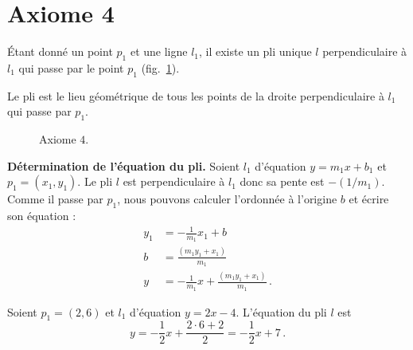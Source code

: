 

\section{Axiome 4}\label{s.ax4}


\begin{axiom}
Étant donné un point $p_1$ et une ligne $l_1$, il existe un pli unique $l$ perpendiculaire à $l_1$ qui passe par le point $p_1$ (fig.~\ref{f.origami-axiom4}).
\end{axiom}

Le pli est le lieu géométrique de tous les points de la droite perpendiculaire à $l_1$ qui passe par $p_1$.

\begin{figure}[htbp]
\centering
{}
\caption{Axiome  $4$.}\label{f.origami-axiom4}
\end{figure}

\noindent\textbf{Détermination de l'équation du pli.}
Soient $l_1$ d'équation $y = m_1x + b_1$ et  $p_1=(x_1,y_1)$. Le pli $l$ est perpendiculaire à $l_1$ donc sa pente est $-(1/m_1)$. Comme il passe par $p_1$, nous pouvons calculer l'ordonnée à l'origine $b$ et écrire son équation :
\begin{align*}
y_1&=-\frac{1}{m_1} x_1 + b\\
b&= \frac{(m_1 y_1+x_1)}{m_1}\\
y&=-\frac{1}{m_1} x +\frac{(m_1y_1+x_1)}{m_1}\,.
\end{align*}
\begin{example}
Soient $p_1=(2,6)$ et  $l_1$ d'équation $y=2x-4$. L'équation du pli $l$ est 
\[
y=-\frac{1}{2}x + \frac{2\cdot 6 + 2}{2}=-\frac{1}{2}x + 7\,.
\]
\end{example}


